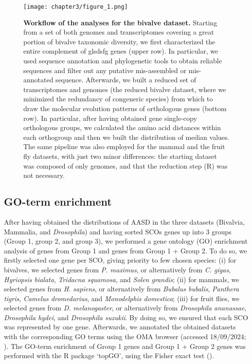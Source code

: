 \documentclass[../main.tex]{subfiles}
\begin{document}
\begin{figure}[t]
	\centering
	\texttt{[image: chapter3/figure\_1.png]}
	\captionsetup{width=\textwidth}
	\caption{
		\textbf{Workflow of the analyses for the bivalve dataset.} Starting from a set of both genomes and transcriptomes covering a great portion of bivalve taxonomic diversity, we first characterized the entire complement of 	gls{dsfg} genes (upper row). In particular, we used sequence annotation and phylogenetic tools to obtain reliable sequences and filter out any putative mis-assembled or mis-annotated sequence. Afterwards, we built a reduced set of transcriptomes and genomes (the reduced bivalve dataset, where we minimized the redundancy of congeneric species) from which to draw the molecular evolution patterns of orthologous genes (bottom row). In particular, after having obtained gene single-copy orthologous groups, we calculated the amino acid distances within each orthogroup and then we built the distribution of median values. The same pipeline was also employed for the mammal and the fruit fly datasets, with just two minor differences: the starting dataset was composed of only genomes, and that the reduction step (R) was not necessary.
	}
	\label{fig:workflow}
\end{figure}

\subsection{GO-term enrichment}
After having obtained the distributions of AASD in the three datasets (Bivalvia, Mammalia, and \textit{Drosophila}) and having sorted SCOs genes up into 3 groups (Group 1, group 2, and group 3), we performed a gene ontology (GO) enrichment analysis of genes from Group 1 and genes from Group 1 + Group 2. To do so, we firstly selected one gene per SCO, giving priority to few chosen species: (i) for bivalves, we selected genes from \textit{P. maximus}, or alternatively from \textit{C. gigas}, \textit{Hyriopsis bialata}, \textit{Tridacna squamosa}, and \textit{Solen grandis}; (ii) for mammals, we selected genes from \textit{H. sapiens}, or alternatively from \textit{Bubalus bubalis}, \textit{Panthera tigris}, \textit{Camelus dromedarius}, and \textit{Monodelphis domestica}; (iii) for fruit flies, we selected genes from \textit{D. melanogaster}, or alternatively from \textit{Drosophila ananassae}, \textit{Drosophila hydei}, and \textit{Drosophila suzukii}. By doing so, we ensured that each SCO was represented by one gene. Afterwards, we annotated the obtained datasets with the corresponding GO terms using the OMA browser (accessed 18/09/2024; \textbf{\cite{altenhoff2024oma}}). The GO-term enrichment of Group 1 genes and Group 1 + Group 2 genes was performed with the R package ‘topGO’, using the Fisher exact test (\textbf{\cite{alexa2009gene}}).
\end{document}
